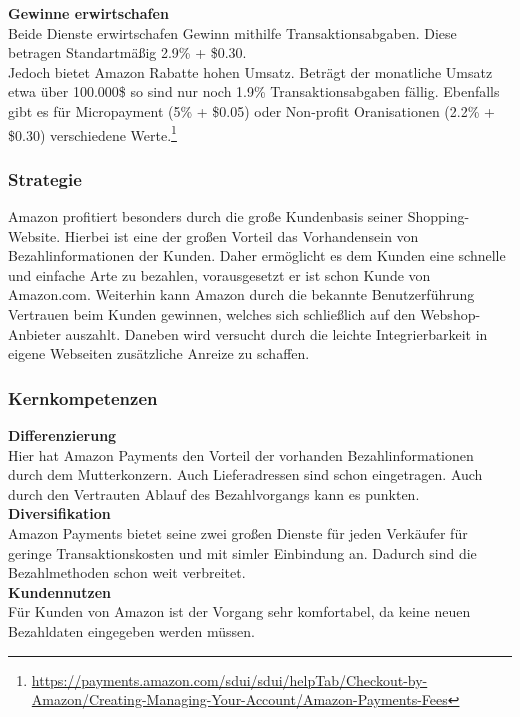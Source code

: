 \textbf{Gewinne erwirtschafen}\\
Beide Dienste erwirtschafen Gewinn mithilfe Transaktionsabgaben. Diese betragen Standartmäßig 2.9\% + \$0.30.\\
Jedoch bietet Amazon Rabatte hohen Umsatz. Beträgt der monatliche Umsatz etwa über 100.000\$ so sind nur noch 1.9\%  Transaktionsabgaben fällig.
Ebenfalls gibt es für Micropayment (5\% + \$0.05) oder Non-profit Oranisationen (2.2\% + \$0.30) verschiedene Werte.\footnote{\url{https://payments.amazon.com/sdui/sdui/helpTab/Checkout-by-Amazon/Creating-Managing-Your-Account/Amazon-Payments-Fees}}

\subsubsection{Strategie}
Amazon profitiert besonders durch die große Kundenbasis seiner Shopping-Website. Hierbei ist eine der großen Vorteil das Vorhandensein von Bezahlinformationen der Kunden. Daher ermöglicht es dem Kunden eine schnelle und einfache Arte zu bezahlen, vorausgesetzt er ist schon Kunde von Amazon.com. Weiterhin kann Amazon durch die bekannte Benutzerführung Vertrauen beim Kunden gewinnen, welches sich schließlich auf den Webshop-Anbieter auszahlt. Daneben wird versucht durch die leichte Integrierbarkeit in eigene Webseiten zusätzliche Anreize zu schaffen. 

\subsubsection{Kernkompetenzen}
\textbf{Differenzierung}\\
Hier hat Amazon Payments den Vorteil der vorhanden Bezahlinformationen durch dem Mutterkonzern. Auch Lieferadressen sind schon eingetragen. Auch durch den Vertrauten Ablauf des Bezahlvorgangs kann es punkten.\\

\textbf{Diversifikation}\\
Amazon Payments bietet seine zwei großen Dienste für jeden Verkäufer für geringe Transaktionskosten und mit simler Einbindung an. Dadurch sind die Bezahlmethoden schon weit verbreitet.\\

\textbf{Kundennutzen}\\
Für Kunden von Amazon ist der Vorgang sehr komfortabel, da keine neuen Bezahldaten eingegeben werden müssen.\\